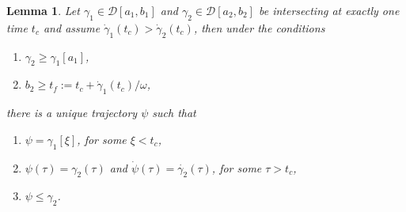 \documentclass[a4paper]{article}
\theoremstyle{definition}
\theoremstyle{plain}
\newtheorem{lemma}{Lemma\hspace{0.25em}\ignorespaces}
\begin{document}
%


\begin{lemma}\label{lemma:curvejoining}
  Let $\gamma_{1} \in \mathcal{D}[a_{1}, b_{1}]$ and $\gamma_{2} \in \mathcal{D}[a_{2}, b_{2}]$ be
  intersecting at exactly one time $t_{c}$ and assume
  $\dot{\gamma}_{1}(t_{c}) > \dot{\gamma}_{2}(t_{c})$, then under the conditions
  \begin{enumerate}[label=(\roman*)\quad,leftmargin=5em]
    \item $\gamma_{2} \geq \gamma_{1}[a_{1}]$,
    \item $b_{2} \geq t_{f} := t_{c} + \dot{\gamma}_{1}(t_{c}) / \omega$,
  \end{enumerate}
  there is a unique trajectory $\psi$ such that
  \begin{enumerate}[label=\textbullet\quad,leftmargin=5em]
    \item $\psi = \gamma_{1}[\xi]$, for some $\xi < t_{c}$,
    \item $\psi(\tau) = \gamma_{2}(\tau)$ and
          $\dot{\psi}(\tau) = \dot{\gamma_{2}}(\tau)$, for some $\tau > t_{c}$,
    \item $\psi \leq \gamma_{2}$.
  \end{enumerate}
\end{lemma}
\end{document}
